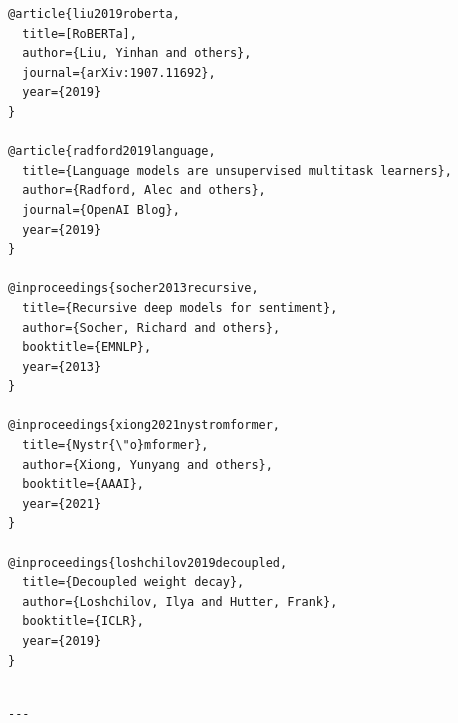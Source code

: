 \begin{lstlisting}
@article{liu2019roberta,
  title=[RoBERTa],
  author={Liu, Yinhan and others},
  journal={arXiv:1907.11692},
  year={2019}
}

@article{radford2019language,
  title={Language models are unsupervised multitask learners},
  author={Radford, Alec and others},
  journal={OpenAI Blog},
  year={2019}
}

@inproceedings{socher2013recursive,
  title={Recursive deep models for sentiment},
  author={Socher, Richard and others},
  booktitle={EMNLP},
  year={2013}
}

@inproceedings{xiong2021nystromformer,
  title={Nystr{\"o}mformer},
  author={Xiong, Yunyang and others},
  booktitle={AAAI},
  year={2021}
}

@inproceedings{loshchilov2019decoupled,
  title={Decoupled weight decay},
  author={Loshchilov, Ilya and Hutter, Frank},
  booktitle={ICLR},
  year={2019}
}
\end{lstlisting}
\begin{lstlisting}

---
\end{lstlisting}
